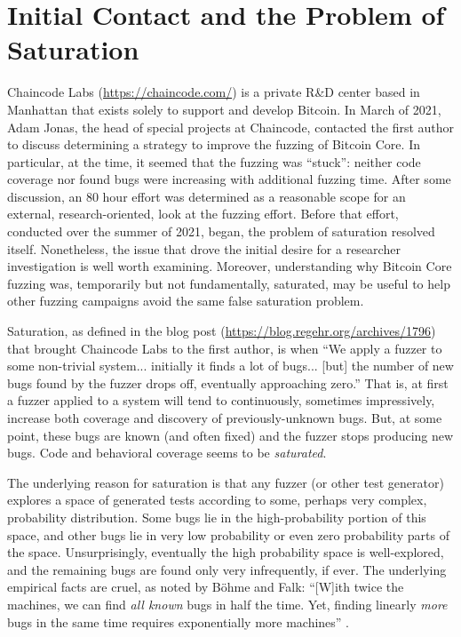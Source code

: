 \section{Initial Contact and the Problem of Saturation}

Chaincode Labs (\url{https://chaincode.com/}) is a private R\&D center based in Manhattan that exists solely to support and develop Bitcoin.  In March of 2021, Adam Jonas, the head of special projects at Chaincode, contacted the first author to discuss determining a strategy to improve the fuzzing of Bitcoin Core.  In particular, at the time, it seemed that the fuzzing was ``stuck'': neither code coverage nor found bugs were increasing with additional fuzzing time.  After some discussion, an 80 hour effort was determined as a reasonable scope for an external, research-oriented, look at the fuzzing effort.  Before that effort, conducted over the summer of 2021, began, the problem of saturation resolved itself.  Nonetheless, the issue that drove the initial desire for a researcher investigation is well worth examining.  Moreover, understanding why Bitcoin Core fuzzing was, temporarily but not fundamentally, saturated, may be useful to help other fuzzing campaigns avoid the same false saturation problem.

Saturation, as defined in the blog post (\url{https://blog.regehr.org/archives/1796}) that brought Chaincode Labs to the first author, is when ``We apply a fuzzer to some non-trivial system... initially it finds a lot of bugs... [but] the number of new bugs found by the fuzzer drops off, eventually approaching zero.''  That is, at first a fuzzer applied to a system will tend to continuously, sometimes impressively, increase both coverage and discovery of previously-unknown bugs.  But, at some point, these bugs are known (and often fixed) and the fuzzer stops producing new bugs.  Code and behavioral coverage seems to be \emph{saturated}.

The underlying reason for saturation is that any fuzzer (or other test generator) explores a space of generated tests according to some, perhaps very complex, probability distribution.  Some bugs lie in the high-probability portion of this space, and other bugs lie in very low probability or even zero probability parts of the space.  Unsurprisingly, eventually the high probability space is well-explored, and the remaining bugs are found only very infrequently, if ever.  The underlying empirical facts are cruel, as noted by B\"{o}hme and Falk:  ``[W]ith twice the machines, we can find \emph{all known} bugs in half the time. Yet, finding linearly \emph{more} bugs in the same time requires exponentially more machines'' \cite{fuzzexp}.

